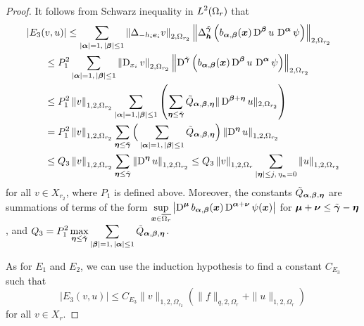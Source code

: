 \begin{proof}
It follows from Schwarz inequality in $\displaystyle L^2(\Omega_r)$ that
\begin{align*}
&\left| E_3(v,u) \right| \leq \sum_{|{\bm{\alpha}}|= 1,\,|{\bm{\beta}}|\leq 1}
\left\| \Delta_{-h_i {\bm{e}}_i} v \right\|_{2,\Omega_{r_2}}
\left\| \Delta_{{\bm{h}}}^{\tilde{{\bm{\gamma}}}} \left(
b_{{\bm{\alpha}},{\bm{\beta}}}({\bm{x}}) \operatorname{D}^{{\bm{\beta}}} u
\, \operatorname{D}^{{\bm{\alpha}}} \psi \right) \right\|_{2,\Omega_{r_2}} \\
&\qquad \leq P_1^2 \sum_{|{\bm{\alpha}}|= 1,\,|{\bm{\beta}}|\leq 1}
\left\| \operatorname{D}_{x_i} v \right\|_{2,\Omega_{r_2}}
\left\| \operatorname{D}^{\tilde{{\bm{\gamma}}}} \left(
b_{{\bm{\alpha}},{\bm{\beta}}}({\bm{x}}) \operatorname{D}^{{\bm{\beta}}} u \,
\operatorname{D}^{{\bm{\alpha}}} \psi \right) \right\|_{2,\Omega_{r_2}} \\
&\qquad \leq P_1^2
\left\| v \right\|_{1,2,\Omega_{r_2}}
\sum_{|{\bm{\alpha}}|= 1 ,|{\bm{\beta}}|\leq 1} \left(
\sum_{{\bm{\eta}} \leq \tilde{{\bm{\gamma}}}}
\tilde{Q}_{{\bm{\alpha}},{\bm{\beta}},{\bm{\eta}} }
\| \operatorname{D}^{{\bm{\beta}}+{\bm{\eta}}} u \|_{2,\Omega_{r_2}} \right) \\
&\qquad = P_1^2 \left\|v\right\|_{1,2,\Omega_{r_2}}
\sum_{{\bm{\eta}} \leq \tilde{{\bm{\gamma}}}} \Big(
\sum_{|{\bm{\alpha}}|=1,\,|{\bm{\beta}}|\leq 1}
\tilde{Q}_{{\bm{\alpha}},{\bm{\beta}},{\bm{\eta}}} \Big)
\left\| \operatorname{D}^{{\bm{\eta}}} u \right\|_{1,2,\Omega_{r_2}} \\
&\qquad \leq Q_3 \left\| v \right\|_{1,2,\Omega_{r_2}}
\sum_{{\bm{\eta}} \leq \tilde{{\bm{\gamma}}}} \left\|
\operatorname{D}^{{\bm{\eta}}} u \right\|_{1,2,\Omega_{r_2}}
\leq Q_3 \left\| v \right\|_{1,2,\Omega_r}
\sum_{|{\bm{\eta}}| \leq j,\, \eta_n=0} \left\| u \right\|_{1,2,\Omega_{r_2}}
\end{align*}
for all $v \in X_{r_2}$, where $P_1$ is defined above.  Moreover,
the constants $\tilde{Q}_{{\bm{\alpha}},{\bm{\beta}},{\bm{\eta}}}$ are
summations of terms of the form
$\displaystyle \sup_{{\bm{x}} \in \overline{\Omega_r}} \left|\operatorname{D}^{{\bm{\mu}}}
b_{{\bm{\alpha}},{\bm{\beta}}}({\bm{x}})\operatorname{D}^{{\bm{\alpha}}+{\bm{\nu}}}
\psi({\bm{x}}) \right|$
for ${\bm{\mu}}+{\bm{\nu}} \leq \tilde{{\bm{\gamma}}} - {\bm{\eta}}$, and
$\displaystyle Q_3 = P_1^2 \max_{{\bm{\eta}} \leq \tilde{{\bm{\gamma}}}}
\sum_{|{\bm{\beta}}|=1,\,|{\bm{\alpha}}|\leq 1}
\tilde{Q}_{{\bm{\alpha}},{\bm{\beta}},{\bm{\eta}}}$.

As for $E_1$ and $E_2$, we can use the induction
hypothesis to find a constant $C_{E_3}$ such that
\[
\left| E_3(v,u) \right| \leq C_{E_3} \|v\|_{1,2,\Omega_{r_2}}
\left( \|f\|_{q,2,\Omega_r} + \|u\|_{1,2,\Omega_r} \right)
\]
for all $v \in X_r$.


\end{proof}
